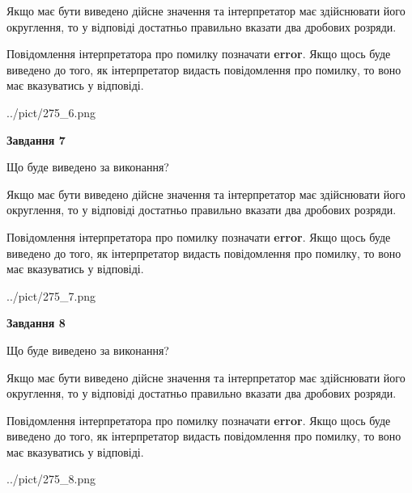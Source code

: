 \documentclass[12pt, ukrainian]{article}
\begin{document}
{\begin {Large}
Якщо має бути виведено дійсне значення та інтерпретатор має здійснювати його округлення, 
то у відповіді достатньо правильно вказати два дробових розряди.

Повідомлення інтерпретатора про помилку позначати \textbf{error}.
Якщо щось буде виведено до того, як інтерпретатор видасть повідомлення про помилку, 
то воно має вказуватись у відповіді. \par

\begin{center}
	{../pict/275_6.png}
\end{center}
\newpage

{\begin {center}\textbf{Завдання 7}\end {center}}\par
Що буде виведено за виконання? \par

Якщо має бути виведено дійсне значення та інтерпретатор має здійснювати його округлення, 
то у відповіді достатньо правильно вказати два дробових розряди.

Повідомлення інтерпретатора про помилку позначати \textbf{error}.
Якщо щось буде виведено до того, як інтерпретатор видасть повідомлення про помилку, 
то воно має вказуватись у відповіді. \par

\begin{center}
	{../pict/275_7.png}
\end{center}
\newpage

{\begin {center}\textbf{Завдання 8}\end {center}}\par
Що буде виведено за виконання? \par

Якщо має бути виведено дійсне значення та інтерпретатор має здійснювати його округлення, 
то у відповіді достатньо правильно вказати два дробових розряди.

Повідомлення інтерпретатора про помилку позначати \textbf{error}.
Якщо щось буде виведено до того, як інтерпретатор видасть повідомлення про помилку, 
то воно має вказуватись у відповіді. \par

\begin{center}
	{../pict/275_8.png}
\end{center}
\newpage


\end{Large}}
\end{document}
